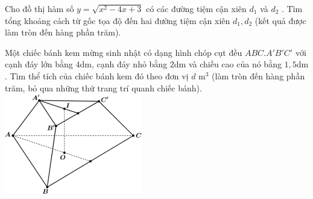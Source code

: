  \begin{ex}%
Cho đồ thị hàm số $y=\sqrt{x^2-4x+3}$ có các đường tiệm cận xiên $d_1$ và $d_2$ . Tìm tổng khoảng cách từ gốc tọa độ đến hai đường tiệm cận xiên $d_1,d_2$ (kết quả được làm tròn đến hàng phần trăm).
\end{ex}
\begin{ex}%
\immini
{
    Một chiếc bánh kem mừng sinh nhật có dạng hình chóp cụt đều $ABC.A'{B}'{C}'$ với cạnh đáy lớn bằng $4$dm, cạnh đáy nhỏ bằng $2$dm và chiều cao của nó bằng $1{,}5$dm . Tìm thể tích của chiếc bánh kem đó theo đơn vị $d$ m$^3$ (làm tròn đến hàng phần trăm, bỏ qua những thứ trang trí quanh chiếc bánh).
}
{
    \includegraphics[width=6cm]{img/HXN-8-19-LG}
}
\end{ex}

